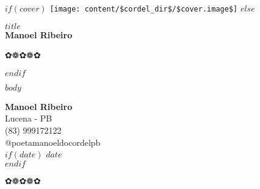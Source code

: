 \documentclass[a6paper,10pt]{book}
\newcommand{\cordelornament}{%
  \begin{center}
    {\Large ✿❁✿❁✿}
  \end{center}
}
\begin{document}
\thispagestyle{empty}
$if(cover)$
  \texttt{[image: content/\$cordel\_dir\$/\$cover.image\$]}
  \clearpage
  \restoregeometry
$else$
  \vspace*{\fill}
  \begin{center}
    {\Huge \textbf{$title$}}\\[1.5cm]
    {\Large \textbf{Manoel Ribeiro}}
    \vspace{1cm}
    \cordelornament
  \end{center}
  \vspace*{\fill}
  \clearpage
$endif$

\pagestyle{cordel}
\setcounter{page}{1}

$body$

\clearpage
\thispagestyle{empty}
\begin{center}
  \LARGE \textbf{Manoel Ribeiro}\\[0.5cm]
  \large Lucena - PB\\
  \large (83) 999172122\\
  \large @poetamanoeldocordelpb\\
  $if(date)$
  \large $date$\\
  $endif$
  \cordelornament
\end{center}
\end{document}
